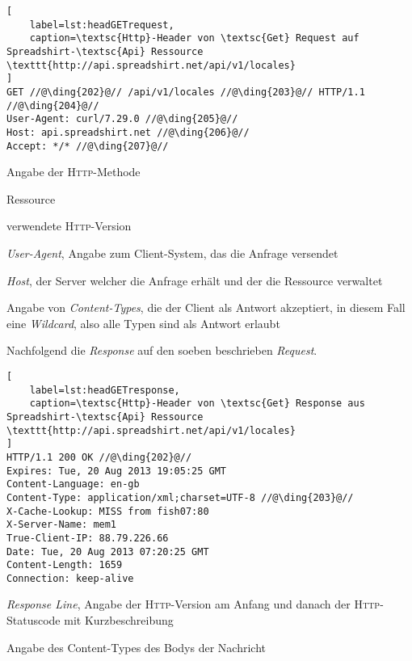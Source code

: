 \begin{lstlisting}[
    label=lst:headGETrequest,
    caption=\textsc{Http}-Header von \textsc{Get} Request auf Spreadshirt-\textsc{Api} Ressource \texttt{http://api.spreadshirt.net/api/v1/locales}
]
GET //@\ding{202}@// /api/v1/locales //@\ding{203}@// HTTP/1.1 //@\ding{204}@//
User-Agent: curl/7.29.0 //@\ding{205}@//
Host: api.spreadshirt.net //@\ding{206}@//
Accept: */* //@\ding{207}@//
\end{lstlisting} 

\begin{compactitem}
    \item[\ding{202}] Angabe der \textsc{Http}-Methode
    \item[\ding{203}] Ressource
    \item[\ding{204}] verwendete \textsc{Http}-Version
    \item[\ding{205}] \emph{User-Agent}, Angabe zum Client-System, das die Anfrage versendet
    \item[\ding{206}] \emph{Host}, der Server welcher die Anfrage erhält und der die Ressource  verwaltet
    \item[\ding{207}] Angabe von \emph{Content-Types}, die der Client als Antwort akzeptiert, in diesem Fall eine \emph{Wildcard}, also alle Typen sind als Antwort erlaubt
\end{compactitem}

Nachfolgend die \emph{Response} auf den soeben beschrieben \emph{Request}.

\begin{lstlisting}[
    label=lst:headGETresponse,
    caption=\textsc{Http}-Header von \textsc{Get} Response aus Spreadshirt-\textsc{Api} Ressource \texttt{http://api.spreadshirt.net/api/v1/locales}
]
HTTP/1.1 200 OK //@\ding{202}@//
Expires: Tue, 20 Aug 2013 19:05:25 GMT
Content-Language: en-gb
Content-Type: application/xml;charset=UTF-8 //@\ding{203}@//
X-Cache-Lookup: MISS from fish07:80
X-Server-Name: mem1
True-Client-IP: 88.79.226.66
Date: Tue, 20 Aug 2013 07:20:25 GMT
Content-Length: 1659
Connection: keep-alive
\end{lstlisting}

\begin{compactitem}
    \item[\ding{202}] \emph{Response Line}, Angabe der \textsc{Http}-Version am Anfang und danach der \textsc{Http}-Statuscode mit Kurzbeschreibung
    \item[\ding{203}] Angabe des Content-Types des Bodys der Nachricht
\end{compactitem}

